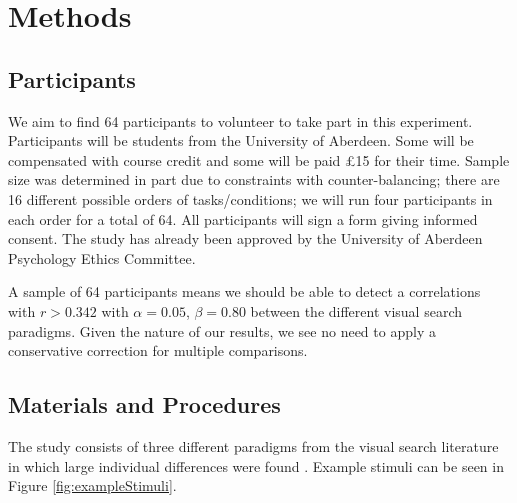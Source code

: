 \documentclass[]{rsos}%
\begin{document}
\section{Methods}


\subsection{Participants}
We aim to find 64 participants to volunteer to take part in this experiment. Participants will be students from the University of Aberdeen. Some will be compensated with course credit and some will be paid \pounds 15 for their time. Sample size was determined in part due to constraints with counter-balancing; there are 16 different possible orders of tasks/conditions; we will run four participants in each order for a total of 64. All participants will sign a form giving informed consent. The study has already been approved by the University of Aberdeen Psychology Ethics Committee.

A sample of 64 participants means we should be able to detect a correlations with $r > 0.342$ with $\alpha = 0.05$, $\beta = 0.80$ between the different visual search paradigms. Given the nature of our results, we see no need to apply a conservative correction for multiple comparisons. 

\subsection{Materials and Procedures}

The study consists of three different paradigms from the visual search literature in which large individual differences were found \cite{nowakowsak2017, irons-leber2016, kristjansson2014}. Example stimuli can be seen in Figure \ref{fig:exampleStimuli}.
\end{document}
